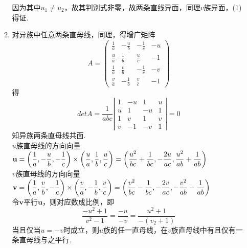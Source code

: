 \documentclass[UTF8]{ctexart}
\begin{document}
\begin{enumerate}
\begin{enumerate}[(1)]
因为其中$u_1\neq u_2$，故其判别式非零，故两条直线异面，同理$v$族异面，(1)得证.
\item 对异族中任意两条直母线，同理，得增广矩阵$$A=\left(\begin{array}{cccc}\displaystyle\frac{1}{a}&\displaystyle-\frac{u}{b}&\displaystyle-\frac{1}{c}&-u\\\displaystyle\frac{u}{a}&\displaystyle\frac{1}{b}&\displaystyle\frac{u}{c}&-1\\\displaystyle\frac{1}{a}&\displaystyle\frac{v}{b}&\displaystyle-\frac{1}{c}&-v\\\displaystyle\frac{v}{a}&\displaystyle-\frac{1}{b}&\displaystyle\frac{v}{c}&-1\end{array}\right)$$
得$$det A=\displaystyle\frac{1}{abc}\left|\begin{array}{cccc}1&-u&1&u\\u&1&-u&1\\1&v&1&v\\v&-1&-v&1\end{array}\right|=0$$
知异族两条直母线共面. \\
$u$族直母线的方向向量$\mathbf{u}=\left(\displaystyle\frac{1}{a},\displaystyle-\frac{u}{b},\displaystyle-\frac{1}{c}\right)\times\left(\displaystyle\frac{u}{a},\displaystyle\frac{1}{b},\displaystyle\frac{u}{c}\right)=\left(\displaystyle\-\frac{u^2}{bc}+\displaystyle\frac{1}{bc},\displaystyle-\frac{2u}{ac},\displaystyle\frac{u^2}{ab}+\displaystyle\frac{1}{ab}\right)$\\
$v$族直母线的方向向量$\mathbf{v}=\left(\displaystyle\frac{1}{a},\displaystyle\frac{v}{b},\displaystyle-\frac{1}{c}\right)\times\left(\displaystyle\frac{v}{a},\displaystyle-\frac{1}{b},\displaystyle\frac{v}{c}\right)=\left(\displaystyle\\\frac{v^2}{bc}-\displaystyle\frac{1}{bc},\displaystyle-\frac{2v}{ac},\displaystyle-\frac{v^2}{ab}-\displaystyle\frac{1}{ab}\right)$\\
令$\mathbf{v}$平行$\mathbf{u}$，则对应数成比例，即$$\displaystyle\frac{-u^2+1}{v^2-1}=\displaystyle\frac{-u}{-v}=\displaystyle\frac{u^2+1}{-\left(v_2+1\right)}$$当且仅当$u=-v$时成立，则$u$族的任一直母线，在$v$族直母线中有且仅有一条直母线与之平行. 
\end{enumerate}


\end{enumerate}
\end{document}
